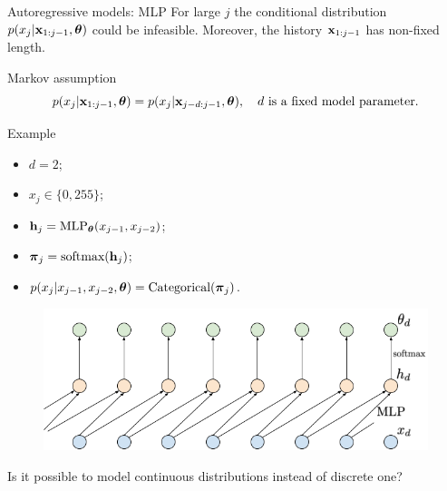 \begin{frame}{Autoregressive models: MLP}
	For large $j$ the conditional distribution $p(x_j | \mathbf{x}_{1:j - 1}, \boldsymbol{\theta})$ could be infeasible. Moreover, the history $\mathbf{x}_{1:j-1}$ has non-fixed length.
	\begin{block}{Markov assumption}
		\vspace{-0.5cm}
		\[
			p(x_j | \mathbf{x}_{1:j - 1}, \boldsymbol{\theta}) = p(x_j | \mathbf{x}_{j - d:j - 1}, \boldsymbol{\theta}), \quad d \text{ is a fixed model parameter}.
		\]
	\end{block}
	\vspace{-0.5cm}
	\begin{block}{Example}
		\begin{minipage}[t]{0.39\columnwidth}
			{\small
			\begin{itemize}
				\item $d = 2$;
				\item $x_j \in \{0, 255\}$;
				\item $\mathbf{h}_j = \text{MLP}_{\boldsymbol{\theta}}(x_{j - 1}, x_{j - 2})$;
				\item $\boldsymbol{\pi}_j = \text{softmax}(\mathbf{h}_j)$;
				\item $p(x_j | x_{j - 1}, x_{j - 2}, \boldsymbol{\theta}) = \text{Categorical}(\boldsymbol{\pi}_j)$.
			\end{itemize}
			}
		\end{minipage}%
		\begin{minipage}[t]{0.61\columnwidth}
			 \begin{figure}
			   \centering
			   \includegraphics[width=1.0\linewidth]{figs/sequential_MLP}
			 \end{figure}
			 Is it possible to model continuous distributions instead of discrete one?
		\end{minipage}
	\end{block}
\end{frame}
